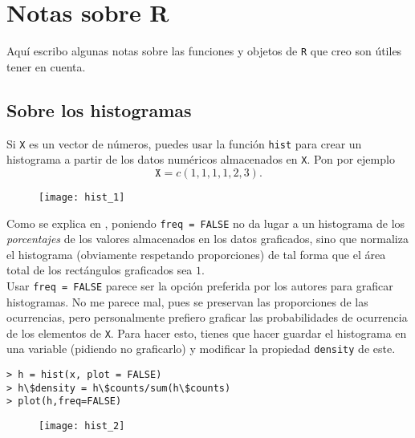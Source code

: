 \chapter{Notas sobre R}

Aquí escribo algunas notas sobre las funciones y objetos de
\texttt{R} que creo son útiles tener en cuenta.

\section{Sobre los histogramas}
Si \texttt{X} es un vector de números, puedes
usar la función \texttt{hist} para crear un histograma
a partir de los datos numéricos almacenados en 
\texttt{X}.
Pon por ejemplo
\[
\texttt{X} = c(1,1,1,1,2,3). 
\]

\begin{figure}[H]
	\centering
	\texttt{[image: hist\_1]} 
\end{figure}	

Como se explica en \cite{hist}, 
poniendo \texttt{freq = FALSE} no da lugar a un histograma
de los \textit{porcentajes} de los valores almacenados en los
datos graficados, sino que normaliza el histograma 
(obviamente respetando proporciones) de tal
forma que el área total de los rectángulos graficados sea $1$. \\

Usar \texttt{freq = FALSE}
parece ser la opción preferida por los autores para graficar
histogramas. No me parece mal, pues se preservan las proporciones
de las ocurrencias, pero personalmente prefiero graficar
las probabilidades de ocurrencia de los elementos de 
\texttt{X}. Para hacer esto, tienes que hacer 
guardar el histograma en una variable (pidiendo no graficarlo)
y modificar la propiedad \texttt{density} de este.

\begin{verbatim}
> h = hist(x, plot = FALSE) 
> h\$density = h\$counts/sum(h\$counts) 
> plot(h,freq=FALSE) 
\end{verbatim}

\begin{figure}[H]
	\centering
	\texttt{[image: hist\_2]} 
\end{figure}	